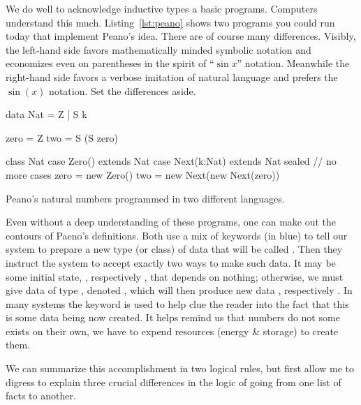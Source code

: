 We do well to acknowledge inductive types a basic programs.
Computers understand this much.
Listing~\ref{lst:peano} shows two programs you could run today that implement Peano's idea.
There are of course many differences.  Visibly, the left-hand side 
favors mathematically minded symbolic notation and 
economizes even on parentheses in the spirit of ``$\sin x$'' notation.
Meanwhile the right-hand side favors a verbose imitation of 
natural language and prefers the $\sin(x)$ notation.  Set the differences 
aside.

\begin{lstfloat}
\begin{center}
\begin{minipage}{0.4\textwidth}
\begin{Fcode}[]
data Nat = Z 
         | S k

zero = Z
two = S (S zero)
\end{Fcode}
\end{minipage}
\hfill
\begin{minipage}{0.59\textwidth}
\begin{Pcode}[language=Sava]
class Nat
    case Zero() extends Nat
    case Next(k:Nat) extends Nat
sealed  // no more cases
zero = new Zero()
two = new Next(new Next(zero))
\end{Pcode}
\end{minipage}
\end{center}
\caption{Peano's natural numbers programmed in two different languages.}
\label{lst:peano}
\end{lstfloat}
    

Even without a deep understanding of these programs, one can make out the
contours of Paeno's definitions.  Both use a mix of keywords (in blue) to tell
our system to prepare a new type (or class) of data that will be called
.  Then they instruct the system to accept exactly two ways to make
such data. It may be some initial state, , respectively ,
that depends on nothing; otherwise, we must give data  of type
, denoted , which will then produce new data ,
respectively .  In many systems the keyword  is 
used to help clue the reader into the fact that this is some data being now 
created.  It helps remind us that numbers do not some exists on their own, 
we have to expend resources (energy \& storage) to create them. 

We can summarize this accomplishment in two logical rules, but first allow 
me to digress to explain three crucial differences in the logic of going from 
one list of facts to another.

